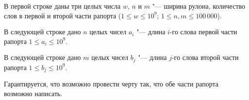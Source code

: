 В первой строке даны три целых числа $w$, $n$ и $m$ "--- ширина рулона, количество слов в первой и второй части рапорта ($1 \le w \le 10^9$; $1 \le n, m \le 100\,000$).

В следующей строке дано $n$ целых чисел $a_i$ "--- длина $i$-го слова первой части рапорта $1 \le a_i \le 10^9$.

В следующей строке дано $m$ целых чисел $b_j$ "--- длина $j$-го слова второй части рапорта $1 \le b_j \le 10^9$.

Гарантируется, что возможно провести черту так, что обе части рапорта возможно написать.